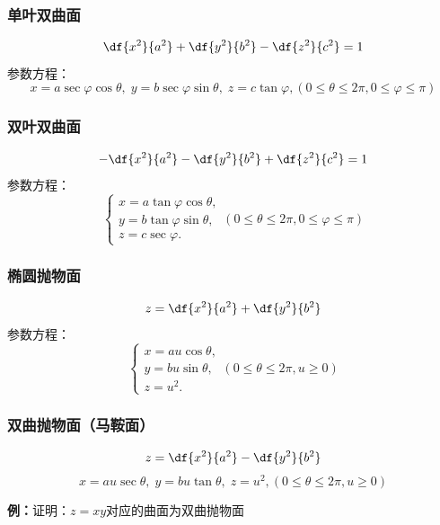 \subsubsection{单叶双曲面}
$${\df{x^2}{a^2}+\df{y^2}{b^2}-\df{z^2}{c^2}=1}$$
参数方程：
$$x=a\sec\varphi\cos\theta,\;y=b\sec\varphi\sin\theta,\;z=c\tan\varphi,
(0\leq\theta\leq 2\pi,0\leq\varphi\leq\pi)$$

\subsubsection{双叶双曲面}
$${-\df{x^2}{a^2}-\df{y^2}{b^2}+\df{z^2}{c^2}=1}$$
参数方程：
$$\left\{\begin{array}{l}
	x=a\tan\varphi\cos\theta,\\
	y=b\tan\varphi\sin\theta,\\
	z=c\sec\varphi.
\end{array}\right.(0\leq\theta\leq 2\pi,0\leq\varphi\leq\pi)$$

\subsubsection{椭圆抛物面}
$${z=\df{x^2}{a^2}+\df{y^2}{b^2}}$$
参数方程：
$$\left\{\begin{array}{l}
	x=au\cos\theta,\\
	y=bu\sin\theta,\\
	z=u^2.
\end{array}\right.(0\leq\theta\leq 2\pi,u\geq 0)$$

\subsubsection{双曲抛物面（马鞍面）}
$${z=\df{x^2}{a^2}-\df{y^2}{b^2}}$$
$$x=au\sec\theta,\;y=bu\tan\theta,\;z=u^2,
(0\leq\theta\leq 2\pi,u\geq
0)$$

{\bf 例：}证明：$z=xy$对应的曲面为双曲抛物面
\begin{center}
\end{center}

